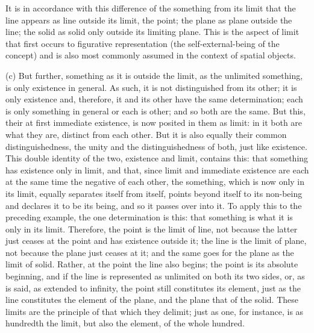 It is in accordance with this difference
of the something from its limit
that the line appears as line outside its limit, the point;
the plane as plane outside the line;
the solid as solid only outside its limiting plane.
This is the aspect of limit that
first occurs to figurative representation
(the self-external-being of the concept)
and is also most commonly assumed
in the context of spatial objects.

(c) But further, something as it is outside the limit,
as the unlimited something, is only existence in general.
As such, it is not distinguished from its other;
it is only existence
and, therefore, it and its other have the same determination;
each is only something in general or each is other;
and so both are the same.
But this, their at first immediate existence,
is now posited in them as limit:
in it both are what they are, distinct from each other.
But it is also equally their common distinguishedness,
the unity and the distinguishedness of both,
just like existence.
This double identity of the two,
existence and limit, contains this:
that something has existence only in limit,
and that, since limit and immediate existence are each
at the same time the negative of each other,
the something, which is now only in its limit,
equally separates itself from itself,
points beyond itself to its non-being
and declares it to be its being,
and so it passes over into it.
To apply this to the preceding example,
the one determination is this:
that something is what it is only in its limit.
Therefore, the point is the limit of line,
not because the latter just ceases at the point
and has existence outside it;
the line is the limit of plane,
not because the plane just ceases at it;
and the same goes for the plane as the limit of solid.
Rather, at the point the line also begins;
the point is its absolute beginning,
and if the line is represented
as unlimited on both its two sides,
or, as is said, as extended to infinity,
the point still constitutes its element,
just as the line constitutes the element of the plane,
and the plane that of the solid.
These limits are the principle
of that which they delimit;
just as one, for instance,
is as hundredth the limit,
but also the element,
of the whole hundred.

